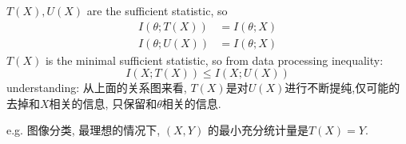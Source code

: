 \begin{proposition}
$T(X),U(X)$ are the sufficient statistic, so
\begin{align*}
I(\theta;T(X)) &= I(\theta;X) \\
I(\theta;U(X)) &= I(\theta;X)
\end{align*}
$T(X)$ is the minimal sufficient statistic, so from data processing inequality:
$$I(X;T(X))\leq I(X;U(X))$$
understanding: 从上面的关系图来看, $T(X)$是对$U(X)$进行不断提纯,仅可能的去掉和$X$相关的信息, 只保留和$\theta$相关的信息.

e.g. 图像分类, 最理想的情况下, $(X,Y)$ 的最小充分统计量是$T(X)=Y$.
\end{proposition}